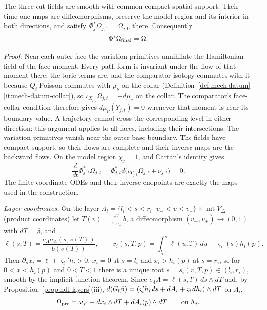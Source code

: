 \begin{proposition}\label{prop:hdl-faces}
The three cut fields are smooth with common compact spatial support. Their time-one maps are
diffeomorphisms, preserve the model region and its interior in both directions, and satisfy
$\Phi_j^*\Omega_{j,1}=\Omega_{j,0}$ there. Consequently
\[
 \Phi^*\Omega_{\rm final}=\Omega.
\]
\end{proposition}
\begin{proof}
Near each outer face the variation primitives annihilate the Hamiltonian field of the face moment. Every path form is
invariant under the flow of that moment there: the toric terms are, and the comparator isotopy commutes with it
because $Q_t$ Poisson-commutes with $\mu_\nu$ on the collar (Definition~\ref{def:mech-datum}\ref{it:mech-datum-collar}),
so $\iota_{X_{\mu_\nu}}\Omega_{j,t}=-d\mu_\nu$ on the collar.
The comparator's face-collar condition therefore gives $d\mu_\nu(Y_{j,t})=0$ whenever that moment is
near its boundary value. A trajectory cannot cross the corresponding level in either direction;
this argument applies to all faces, including their intersections. The variation primitives vanish
near the outer base boundary. The fields have compact support, so their flows are complete and their
inverse maps are the backward flows. On the model region $\chi_j=1$, and Cartan's identity gives
\[
 \frac d{dt}\Phi_{j,t}^*\Omega_{j,t}
 =\Phi_{j,t}^*d\bigl(\iota_{Y_{j,t}}\Omega_{j,t}+\nu_{j,t}\bigr)=0.
\]
The finite coordinate ODEs and their inverse endpoints are exactly the maps used in the construction.
\end{proof}

\emph{Layer coordinates.} On the layer $\Lambda_i=\{l_i<s<r_i,\ v_-<v<v_+\}\times\operatorname{int}V_\Delta$ (product
coordinates) let $T(v)=\int_{v_-}^vb$, a diffeomorphism $(v_-,v_+)\to(0,1)$ with $dT=\beta$, and
\begin{equation}\label{eq:hdl-layer-x}
 \ell(s,T)=\frac{e_\Lambda a_\Lambda(s,v(T))}{b(v(T))},\qquad
 x_i(s,T,p)=\int_{l_i}^s\ell(u,T)\,du+\varsigma_i(s)h_i(p).
\end{equation}
Then $\partial_sx_i=\ell+\varsigma_i'h_i>0$, $x_i=0$ at $s=l_i$ and $x_i>h_i(p)$ at $s=r_i$, so for $0<x<h_i(p)$ and
$0<T<1$ there is a unique root $s=s_i(x,T,p)\in(l_i,r_i)$, smooth by the implicit function theorem. Since
$e_\Lambda\Lambda=\ell(s,T)\,ds\wedge dT$ and, by Proposition~\ref{prop:hdl-layers}(iii),
$d(G_{\rm f}\beta)=(\varsigma_i'h_i\,ds+dA_i+\varsigma_i\,dh_i)\wedge dT$ on $\Lambda_i$,
\begin{equation}\label{eq:hdl-layer-form}
 \Omega_{\rm pre}=\omega_V+dx_i\wedge dT+dA_i(p)\wedge dT\qquad\text{on }\Lambda_i .
\end{equation}


